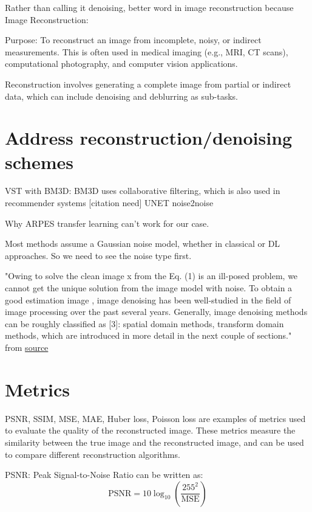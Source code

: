 
Rather than calling it denoising, better word in image reconstruction because
Image Reconstruction:

Purpose: To reconstruct an image from incomplete, noisy, or indirect measurements. This is often used in medical imaging (e.g., MRI, CT scans), computational photography, and computer vision applications. 

Reconstruction involves generating a complete image from partial or indirect data, which can include denoising and deblurring as sub-tasks.

\section{Address reconstruction/denoising schemes}
VST with BM3D: BM3D uses collaborative filtering, which is also used in recommender systems [citation need]
UNET noise2noise

Why ARPES transfer learning can't work for our case.


Most methods assume a Gaussian noise model, whether in classical or DL approaches. So we need to see the noise type first.

"Owing to solve the clean image x from the Eq. (1) is an ill-posed problem, we cannot get the unique solution from the image model with noise. To obtain a good estimation image 
, image denoising has been well-studied in the field of image processing over the past several years. Generally, image denoising methods can be roughly classified as [3]: spatial domain methods, transform domain methods, which are introduced in more detail in the next couple of sections." from \href{https://vciba.springeropen.com/articles/10.1186/s42492-019-0016-7}{source}

\section{Metrics}
\gls{PSNR}, \gls{SSIM}, \gls{MSE}, \gls{MAE}, Huber loss, Poisson loss are examples of metrics used to evaluate the quality of the reconstructed image. These metrics measure the similarity between the true image and the reconstructed image, and can be used to compare different reconstruction algorithms.

PSNR: Peak Signal-to-Noise Ratio can be written as:
\begin{equation}
    \text{PSNR} = 10 \log_{10} \left( \frac{255^2}{\text{MSE}} \right)
\end{equation}

